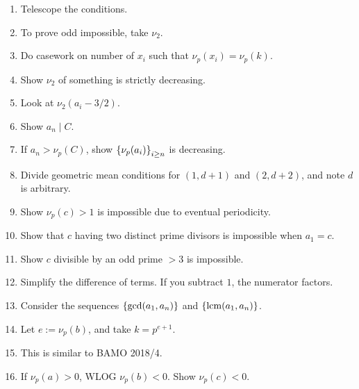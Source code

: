 \documentclass[11pt,paper=letter]{scrartcl}
\begin{document}
\begin{enumerate}

\item \label{h:4-1} \label{h:9-1} \label{h:11-1} Telescope the conditions.

\item \label{h:5-1} To prove odd impossible, take $\nu_2$.

\item \label{h:6-1} Do casework on number of $x_i$ such that $\nu_p(x_i) = \nu_p(k)$.

\item \label{h:7-1} Show $\nu_2$ of something is strictly decreasing.

\item \label{h:7-2} Look at $\nu_2(a_i - 3/2)$.

\item \label{h:8-1} Show $a_n \mid C$.

\item \label{h:8-2} If $a_n > \nu_p(C)$, show $\left\{ \nu_p(a_i) \right\}_{i \ge n}$ is decreasing.

\item \label{h:9-2} Divide geometric mean conditions for $(1, d+1)$ and $(2, d+2)$, and note $d$ is arbitrary.

\item \label{h:10-1} Show $\nu_p(c) > 1$ is impossible due to eventual periodicity.

\item \label{h:10-2} Show that $c$ having two distinct prime divisors is impossible when $a_1 = c$.

\item \label{h:10-3} Show $c$ divisible by an odd prime $> 3$ is impossible.

\item \label{h:11-2} Simplify the difference of terms. If you subtract $1$, the numerator factors.

\item \label{h:11-3} Consider the sequences $\left\{ \gcd(a_1, a_n) \right\}$ and $\left\{ \operatorname*{lcm}(a_1, a_n) \right\}$.

\item \label{h:12-1} Let $e := \nu_p(b)$, and take $k = p^{e+1}$.

\item \label{h:13-1} This is similar to BAMO 2018/4.

\item \label{h:13-2} If $\nu_p(a) > 0$, WLOG $\nu_p(b) < 0$. Show $\nu_p(c) < 0$.


\end{enumerate}
\end{document}
